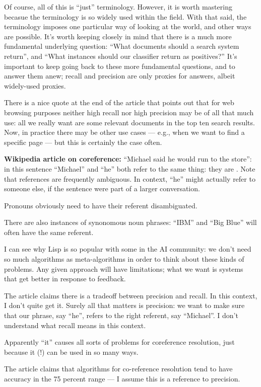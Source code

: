 Of course, all of this is ``just'' terminology.  However, it is worth
mastering becasue the terminology is so widely used within the field.
With that said, the terminology imposes one particular way of looking
at the world, and other ways are possible.  It's worth keeping closely
in mind that there is a much more fundamental underlying question:
``What documents should a search system return'', and ``What instances
should our classifier return as positives?''  It's important to keep
going back to these more fundamental questions, and to answer them
anew; recall and precision are only proxies for answers, albeit
widely-used proxies.

There is a nice quote at the end of the article that points out that
for web browsing purposes neither high recall nor high precision may
be of all that much use: all we really want are some relevant
documents in the top ten search results.  Now, in practice there may
be other use cases --- e.g., when we want to find a specific page ---
but this is certainly the case often.

\textbf{Wikipedia article on coreference:} ``Michael said he would run
to the store'': in this sentence ``Michael'' and ``he'' both refer to
the same thing: they are .  Note that references are
frequently ambiguous.  In context, ``he'' might actually refer to
someone else, if the sentence were part of a larger conversation.

Pronouns obviously need to have their referent disambiguated.  

There are also instances of synonomous noun phrases: ``IBM'' and ``Big
Blue'' will often have the same referent.

I can see why Lisp is so popular with some in the AI community: we
don't need so much algorithms as meta-algorithms in order to think
about these kinds of problems.  Any given approach will have
limitations; what we want is systems that get better in response to
feedback.

The article claims there is a tradeoff between precision and
recall. In this context, I don't quite get it.  Surely all that
matters is precision: we want to make sure that our phrase, say
``he'', refers to the right referent, say ``Michael''.  I don't
understand what recall means in this context.

Apparently ``it'' causes all sorts of problems for coreference
resolution, just because it (!) can be used in so many ways.

The article claims that algorithms for co-reference resolution tend to
have accuracy in the 75 percent range --- I assume this is a reference
to precision.

